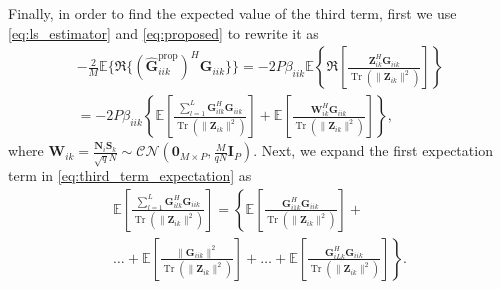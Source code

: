 \documentclass[journal,12pt,onecolumn]{IEEEtran}
\DeclareMathOperator{\Tr}{Tr}
\begin{document}
Finally, in order to find the expected value of the third term, first we use \eqref{eq:ls_estimator} and \eqref{eq:proposed} to rewrite it as
\begin{equation}\label{eq:third_term_expectation}
\begin{split}
-\frac{2}{M}\mathbb{E} \{\mathfrak{R}\{ (\hat{\textbf{G}}_{iik}^{\text{prop}})^{H} \textbf{G}_{iik} \}\} =  -2P \beta_{iik} \mathbb{E} \left\lbrace \mathfrak{R} \left[ \frac{\textbf{Z}_{ik}^{H} \textbf{G}_{iik} }{\Tr \left( \lVert \textbf{Z}_{ik} \rVert^{2} \right)}  \right] \right\rbrace \\
= -2P \beta_{iik} \left\lbrace \mathbb{E} \left[ \frac{\sum_{l=1}^{L} \textbf{G}_{ilk}^{H} \textbf{G}_{iik}}{\Tr \left( \lVert \textbf{Z}_{ik} \rVert^{2} \right)} \right] + \mathbb{E} \left[ \frac{\textbf{W}_{ik}^{H} \textbf{G}_{iik}}{\Tr \left( \lVert \textbf{Z}_{ik} \rVert^{2} \right)} \right] \right\rbrace,
\end{split}
\end{equation}
where $\textbf{W}_{ik} = \frac{\textbf{N}_{i}\textbf{S}_{k}}{\sqrt{q}N} \sim \mathcal{CN}(\textbf{0}_{M \times P},\frac{M}{qN}\textbf{I}_{P})$. Next, we expand the first expectation term in \eqref{eq:third_term_expectation} as
\begin{equation}\label{eq:third_term_expectation_1}
\begin{split}
\mathbb{E} \left[ \frac{\sum_{l=1}^{L} \textbf{G}_{ilk}^{H} \textbf{G}_{iik}}{\Tr \left( \lVert \textbf{Z}_{ik} \rVert^{2} \right)} \right] = \left\lbrace \mathbb{E} \left[ \frac{ \textbf{G}_{i1k}^{H} \textbf{G}_{iik}}{\Tr \left( \lVert \textbf{Z}_{ik} \rVert^{2} \right)} \right] +  \right. \\ \left.  \ldots + \mathbb{E} \left[ \frac{ \lVert \textbf{G}_{iik} \rVert^{2} } {\Tr \left( \lVert \textbf{Z}_{ik} \rVert^{2} \right)} \right] + \ldots + \mathbb{E} \left[ \frac{ \textbf{G}_{iLk}^{H} \textbf{G}_{iik}}{\Tr \left( \lVert \textbf{Z}_{ik} \rVert^{2} \right)} \right]  \right\rbrace.
\end{split}
\end{equation}
\end{document}

